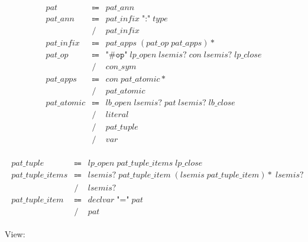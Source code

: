 \begin{align*}
    \begin{array}{rcll}
        \mathit{pat}
        &\Coloneq &\mathit{pat\_ann} \\
        \mathit{pat\_ann}
        &\Coloneq &\mathit{pat\_infix}\; \texttt{":"}\; \mathit{type} \\
        &\mathrel{/} &\mathit{pat\_infix} \\
        \mathit{pat\_infix}
        &\Coloneq &\mathit{pat\_apps}\; (\mathit{pat\_op}\; \mathit{pat\_apps}){*} \\
        \mathit{pat\_op}
        &\Coloneq &\texttt{"\#op"}\; \mathit{lp\_open}\; \mathit{lsemis}{?}\; \mathit{con}\; \mathit{lsemis}{?}\; \mathit{lp\_close} \\
        &\mathrel{/} &\mathit{con\_sym} \\
        \mathit{pat\_apps}
        &\Coloneq &\mathit{con}\; \mathit{pat\_atomic}{*} \\
        &\mathrel{/} &\mathit{pat\_atomic} \\
        \mathit{pat\_atomic}
        &\Coloneq &\mathit{lb\_open}\; \mathit{lsemis}{?}\; \mathit{pat}\; \mathit{lsemis}{?}\; \mathit{lb\_close} \\
        &\mathrel{/} &\mathit{literal} \\
        &\mathrel{/} &\mathit{pat\_tuple} \\
        &\mathrel{/} &\mathit{var}
    \end{array}
\end{align*}

\begin{align*}
    \begin{array}{rcll}
        \mathit{pat\_tuple}
        &\Coloneq &\mathit{lp\_open}\; \mathit{pat\_tuple\_items}\; \mathit{lp\_close} \\
        \mathit{pat\_tuple\_items}
        &\Coloneq &\mathit{lsemis}{?}\; \mathit{pat\_tuple\_item}\; (\mathit{lsemis}\; \mathit{pat\_tuple\_item}){*}\; \mathit{lsemis}{?} \\
        &\mathrel{/} &\mathit{lsemis}{?} \\
        \mathit{pat\_tuple\_item}
        &\Coloneq &\mathit{declvar}\; \texttt{"="}\; \mathit{pat} \\
        &\mathrel{/} &\mathit{pat}
    \end{array}
\end{align*}

View:

